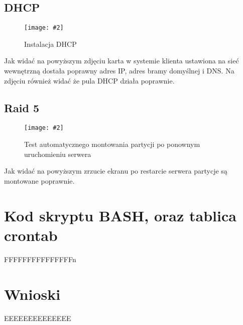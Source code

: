 \documentclass[a4paper]{article}
\newcommand*{\zdj}[2][\textwidth]{\texttt{[image: \#2]}}
\newcommand*{\fgc}[5][!htb]{
      \begin{figure*}[#1]
            \phantomsection\label{fig:#5}
            \zdj{#2}
            \caption[#4]{#3}
      \end{figure*}
}
\begin{document}
\subsection{DHCP}
\vspace*{-10pt}
\fgc{contents/configuration/DHCP/4.png}{Instalacja DHCP}{Instalacja DHCP}{dhcp-test}
\vspace*{-5pt}
Jak widać na powyższym zdjęciu karta w systemie klienta ustawiona na sieć wewnętrzną dostała poprawny adres IP, adres bramy domyślnej i DNS. Na zdjęciu również widać że pula DHCP działa poprawnie. 
\newpage
\subsection{Raid 5}
\fgc{contents/configuration/Raid5/10.png}{Test automatycznego montowania partycji po ponownym uruchomieniu serwera}{Test automatycznego montowania}{raid5-auto-mount-test}
Jak widać na powyższym zrzucie ekranu po restarcie serwera partycje są montowane poprawnie. 



\section{Kod skryptu BASH, oraz tablica crontab}
FFFFFFFFFFFFFFFn
\section{Wnioski}
EEEEEEEEEEEEEE
\newpage
\nocite{k8s-docs}
\nocite{k8s-blog}
\nocite{k8s-github}
\printbibliography[heading=bibnumbered, label=Literatura, title=Literatura]
\end{document}
